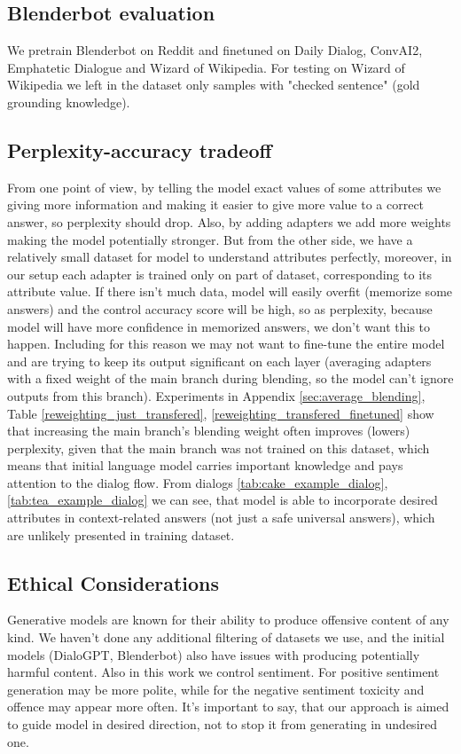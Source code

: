 \documentclass[11pt]{article}
\begin{document}
\subsection{Blenderbot evaluation}
\label{sec:blenderbot_evaluation}
We pretrain Blenderbot on Reddit and finetuned on Daily Dialog, ConvAI2, Emphatetic Dialogue and Wizard of Wikipedia.
For testing on Wizard of Wikipedia we left in the dataset only samples with "checked sentence"{} (gold grounding knowledge).

\subsection{Perplexity-accuracy tradeoff}
\label{sec:perplexity_accuracy_tradeoff}
From one point of view, by telling the model exact values of some attributes we giving more information and making it easier to give more value to a correct answer, so perplexity should drop. Also, by adding adapters we add more weights making the model potentially stronger. But from the other side, we have a relatively small dataset for model to understand attributes perfectly, moreover, in our setup each adapter is trained only on part of dataset, corresponding to its attribute value. If there isn't much data, model will easily overfit (memorize some answers) and the control accuracy score will be high, so as perplexity, because model will have more confidence in memorized answers, we don't want this to happen. Including for this reason we may not want to fine-tune the entire model and are trying to keep its output significant on each layer (averaging adapters with a fixed weight of the main branch during blending, so the model can't ignore outputs from this branch). Experiments in Appendix \ref{sec:average_blending}, Table \ref{reweighting_just_transfered}, \ref{reweighting_transfered_finetuned} show that increasing the main branch's blending weight often improves (lowers) perplexity, given that the main branch was not trained on this dataset, which means that initial language model carries important knowledge and pays attention to the dialog flow. From dialogs \ref{tab:cake_example_dialog}, \ref{tab:tea_example_dialog} we can see, that model is able to incorporate desired attributes in context-related answers (not just a safe universal answers), which are unlikely presented in training dataset.

\subsection{Ethical Considerations}
\label{sec:ethical_considerations}
Generative models are known for their ability to produce offensive content of any kind. We haven't done any additional filtering of datasets we use, and the initial models (DialoGPT, Blenderbot) also have issues with producing potentially harmful content. Also in this work we control sentiment. For positive sentiment generation may be more polite, while for the negative sentiment toxicity and offence may appear more often. It's important to say, that our approach is aimed to guide model in desired direction, not to stop it from generating in undesired one.
\end{document}
